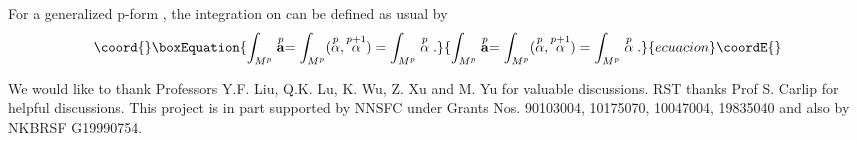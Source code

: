 \documentclass[a4paper,twocolumn,showpacs,prd]{revtex4}
\begin{document}
For a generalized p-form \coordHE{}, the
integration on \coordHE{} can be defined as usual by
\begin{equation}\coord{}\boxEquation{
\int_{M^p} \GForm{p}{a}=\int_{M^p}
(\Form{p}{\alpha},\Form{p+1}{\alpha}) =
\int_{M^p} \Form{p}{\alpha} .
}{
\int_{M^p} \GForm{p}{a}=\int_{M^p}
(\Form{p}{\alpha},\Form{p+1}{\alpha}) =
\int_{M^p} \Form{p}{\alpha} .
}{ecuacion}\coordE{}\end{equation}


\begin{acknowledgments}
We would like to thank Professors Y.F. Liu, Q.K. Lu, K. Wu, Z. Xu
and M. Yu for valuable discussions. RST thanks Prof S. Carlip for
helpful discussions. This project is in part supported by NNSFC
under Grants Nos. 90103004, 10175070, 10047004, 19835040 and also
by NKBRSF G19990754.
\end{acknowledgments}
\end{document}
